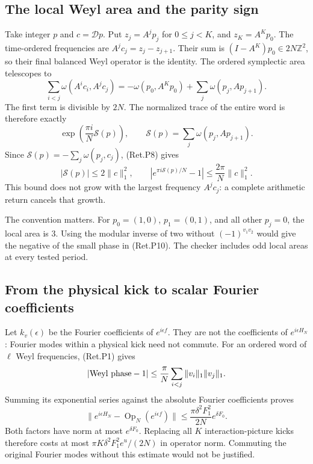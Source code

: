 \hypertarget{the-local-weyl-area-and-the-parity-sign}{%
\subsection{The local Weyl area and the parity sign}\label{the-local-weyl-area-and-the-parity-sign}}

Take integer \(p\) and \(c=\mathcal Dp\).
Put \(z_j=A^jp_j\) for \(0\le j<K\), and \(z_K=A^Kp_0\).
The time-ordered frequencies are \(A^jc_j=z_j-z_{j+1}\).
Their sum is \((I-A^K)p_0\in2N\mathbb Z^2\), so their final
balanced Weyl operator is the identity.
The ordered symplectic area telescopes to
\[
 \sum_{i<j}\omega(A^ic_i,A^jc_j)
   =-\omega(p_0,A^Kp_0)+\sum_j\omega(p_j,Ap_{j+1}).
\]
The first term is divisible by \(2N\). The normalized trace of the
entire word is therefore exactly
\[
 \exp\left(\frac{\pi i}{N}\mathcal S(p)\right),\qquad
              \mathcal S(p)=\sum_j\omega(p_j,Ap_{j+1}).     \tag{Ret.P10}
\]
Since \(\mathcal S(p)=-\sum_j\omega(p_j,c_j)\), (Ret.P8) gives
\[
 |\mathcal S(p)|\le2\|c\|_1^2,\qquad
 \left|e^{\pi i\mathcal S(p)/N}-1\right|
                         \le\frac{2\pi}{N}\|c\|_1^2.       \tag{Ret.P11}
\]
This bound does not grow with the largest frequency \(A^jc_j\):
a complete arithmetic return cancels that growth.

The convention matters. For \(p_0=(1,0)\), \(p_1=(0,1)\), and all
other \(p_j=0\), the local area is 3.
Using the modular inverse of two without \((-1)^{v_1v_2}\)
would give the negative of the small phase in (Ret.P10).
The checker includes odd local areas at every tested period.

\hypertarget{from-the-physical-kick-to-scalar-fourier-coefficients}{%
\subsection{From the physical kick to scalar Fourier coefficients}\label{from-the-physical-kick-to-scalar-fourier-coefficients}}

Let \(k_v(\epsilon)\) be the Fourier coefficients of \(e^{i\epsilon f}\).
They are not the coefficients of \(e^{i\epsilon H_N}\):
Fourier modes within a physical kick need not commute.
For an ordered word of \(\ell\) Weyl frequencies, (Ret.P1) gives
\[
 |\hbox{Weyl phase}-1|
              \le\frac{\pi}{N}\sum_{i<j}\|v_i\|_1\|v_j\|_1.
\]
Summing its exponential series against the absolute Fourier
coefficients proves
\[
 \|e^{i\epsilon H_N}-\operatorname{Op}_N(e^{i\epsilon f})\|
       \le\frac{\pi\delta^2F_1^2}{2N}e^{\delta F_0}.        \tag{Ret.P12}
\]
Both factors have norm at most \(e^{\delta F_0}\).
Replacing all \(K\) interaction-picture kicks therefore costs at most
\(\pi K\delta^2F_1^2e^u/(2N)\) in operator norm.
Commuting the original Fourier modes without this estimate
would not be justified.

